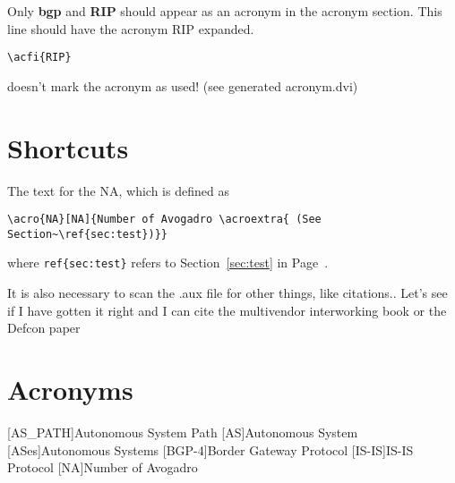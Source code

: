 \documentclass[a4paper,11pt]{article}
\begin{document}
Only \textbf{\ac{bgp}} and \textbf{\ac{RIP}} should appear as an
acronym in the acronym section. This line should have the acronym
\ac{RIP} expanded. 
\begin{verbatim}
\acfi{RIP}
\end{verbatim}
doesn't mark the acronym as used! (see generated acronym.dvi)

\section{Shortcuts}
\label{sec:shortcut}

The text for the \ac{NA}, which is defined as
\begin{verbatim}
\acro{NA}[NA]{Number of Avogadro \acroextra{ (See Section~\ref{sec:test})}}
\end{verbatim}
where \texttt{ref\{sec:test\}} refers to Section~\ref{sec:test} in
Page~\pageref{sec:test}.

It is also necessary to scan the .aux file for other things, like
citations.. Let's see if I have gotten it right and I can cite the
multivendor interworking book \cite{Goralski-cisco-juniper} or the
Defcon paper \cite{defcon16-bgp}

\section*{Acronyms}
\begin{acronym}[BGP-4]
[AS\_PATH]{Autonomous System Path}
[AS]{Autonomous System}
[ASes]{Autonomous Systems}
[BGP-4]{Border Gateway Protocol}
[IS-IS]{IS-IS Protocol}
[NA]{Number of Avogadro }
\end{acronym}



\end{document}

